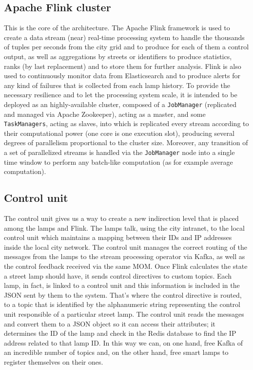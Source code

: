 \subsection{Apache Flink cluster}
This is the core of the architecture. The Apache Flink framework is used to create a data stream (near) real-time processing system to handle the thousands of tuples per seconds from the city grid and to produce for each of them a control output, as well as aggregations by streets or identifiers to produce statistics, ranks (by last replacement) and to store them for further analysis. Flink is also used to continuously monitor data from Elasticsearch and to produce alerts for any kind of failures that is collected from each lamp history. To provide the necessary resilience and to let the processing system scale, it is intended to be deployed as an highly-available cluster, composed of a \texttt{JobManager} (replicated and managed via Apache Zookeeper), acting as a master, and some \texttt{TaskManagers}, acting as slaves, into which is replicated every stream according to their computational power (one core is one execution slot), producing several degrees of parallelism proportional to the cluster size. Moreover, any transition of a set of parallelized streams is handled via the \texttt{JobManager} node into a single time window to perform any batch-like computation (as for example average computation).

\subsection{Control unit}
The control unit gives us a way to create a new indirection level that is placed among the lamps and Flink. The lamps talk, using the city intranet, to the local control unit which maintains a mapping between their IDs and IP addresses inside the local city network. The control unit manages the correct routing of the messages from the lamps to the stream processing operator via Kafka, as well as the control feedback received via the same MOM.
Once Flink calculates the state a street lamp should have, it sends control directives to custom topics. Each lamp, in fact, is linked to a control unit and this information is included in the JSON sent by them to the system. That’s where the control directive is routed, to a topic that is identified by the alphanumeric string representing the control unit responsible of a particular street lamp. The control unit reads the messages and convert them to a JSON object so it can access their attributes; it determines the ID of the lamp and check in the Redis database to find the IP address related to that lamp ID.
In this way we can, on one hand, free Kafka of an incredible number of topics and, on the other hand, free smart lamps to register themselves on their ones.
 
